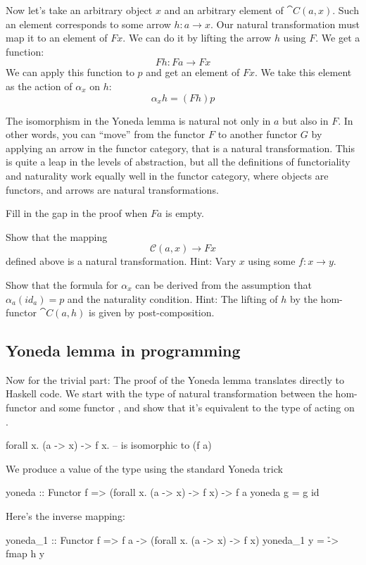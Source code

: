 \documentclass[DaoFP]{subfiles}
\begin{document}
Now let's take an arbitrary object $x$ and an arbitrary element of $\cat C(a, x)$. Such an element corresponds to some arrow $h \colon a \to x$. Our natural transformation must map it to an element of $F x$. We can do it by lifting the arrow $h$ using $F$. We get a function:
\[F h \colon F a \to F x \]
We can apply this function to $p$ and get an element of $F x$. We take this element as the action of $\alpha_x$ on $h$:
\[ \alpha_x h = (F h) p \]

The isomorphism in the Yoneda lemma is natural not only in $a$ but also in $F$. In other words, you can ``move'' from the functor $F$ to another functor $G$ by applying an arrow in the functor category, that is a natural transformation. This is quite a leap in the levels of abstraction, but all the definitions of functoriality and naturality work equally well in the functor category, where objects are functors, and arrows are natural transformations.

\begin{exercise}
Fill in the gap in the proof when $F a$ is empty.
\end{exercise}
\begin{exercise}
Show that the mapping 
\[ \mathcal{C}(a, x) \to F x\]
defined above is a natural transformation. Hint: Vary $x$ using some $f \colon x \to y$.
\end{exercise}
\begin{exercise}
Show that the formula for $\alpha_x$ can be derived from the assumption that $\alpha_a (id_a) = p$ and the naturality condition. Hint: The lifting of $h$ by the hom-functor $\cat C(a, h)$ is given by post-composition.
\end{exercise}

\subsection{Yoneda lemma in programming}

Now for the trivial part: The proof of the Yoneda lemma translates directly to Haskell code. We start with the type of natural transformation between the hom-functor  and some functor , and show that it's equivalent to the type of  acting on .
\begin{haskell}
forall x. (a -> x) -> f x.   -- is isomorphic to (f a)
\end{haskell}
We produce a value of the type  using the standard Yoneda trick
\begin{haskell}
yoneda :: Functor f => (forall x. (a -> x) -> f x) -> f a
yoneda g = g id
\end{haskell}
Here's the inverse mapping:
\begin{haskell}
yoneda_1 :: Functor f => f a -> (forall x. (a -> x) -> f x)
yoneda_1 y = \h -> fmap h y
\end{haskell}
\end{document}
